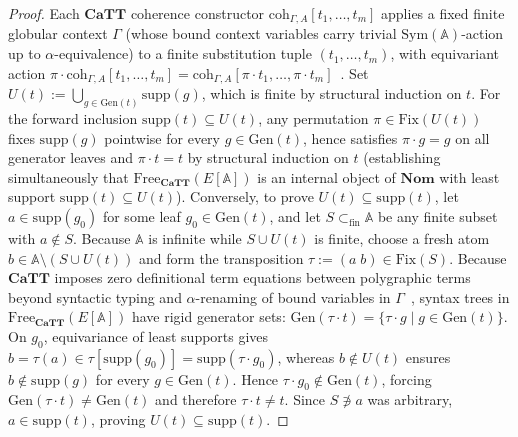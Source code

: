 \begin{proof}
Each $\mathbf{CaTT}$ coherence constructor $\mathrm{coh}_{\Gamma, A}[t_1, \dots, t_m]$ applies a fixed finite globular context $\Gamma$ (whose bound context variables carry trivial $\mathrm{Sym}(\mathbb{A})$-action up to $\alpha$-equivalence) to a finite substitution tuple $(t_1, \dots, t_m)$, with equivariant action $\pi \cdot \mathrm{coh}_{\Gamma, A}[t_1, \dots, t_m] = \mathrm{coh}_{\Gamma, A}[\pi \cdot t_1, \dots, \pi \cdot t_m]$~\cite{FinsterMimram17,BCM26}. Set $U(t) := \bigcup_{g \in \mathrm{Gen}(t)} \mathrm{supp}(g)$, which is finite by structural induction on $t$. For the forward inclusion $\mathrm{supp}(t) \subseteq U(t)$, any permutation $\pi \in \mathrm{Fix}(U(t))$ fixes $\mathrm{supp}(g)$ pointwise for every $g \in \mathrm{Gen}(t)$, hence satisfies $\pi \cdot g = g$ on all generator leaves and $\pi \cdot t = t$ by structural induction on $t$ (establishing simultaneously that $\mathrm{Free}_{\mathbf{CaTT}}(E[\mathbb{A}])$ is an internal object of $\mathbf{Nom}$ with least support $\mathrm{supp}(t) \subseteq U(t)$). Conversely, to prove $U(t) \subseteq \mathrm{supp}(t)$, let $a \in \mathrm{supp}(g_0)$ for some leaf $g_0 \in \mathrm{Gen}(t)$, and let $S \subset_{\mathrm{fin}} \mathbb{A}$ be any finite subset with $a \notin S$. Because $\mathbb{A}$ is infinite while $S \cup U(t)$ is finite, choose a fresh atom $b \in \mathbb{A} \setminus (S \cup U(t))$ and form the transposition $\tau := (a \; b) \in \mathrm{Fix}(S)$. Because $\mathbf{CaTT}$ imposes zero definitional term equations between polygraphic terms beyond syntactic typing and $\alpha$-renaming of bound variables in $\Gamma$~\cite{FinsterMimram17,BCM26}, syntax trees in $\mathrm{Free}_{\mathbf{CaTT}}(E[\mathbb{A}])$ have rigid generator sets: $\mathrm{Gen}(\tau \cdot t) = \{\tau \cdot g \mid g \in \mathrm{Gen}(t)\}$. On $g_0$, equivariance of least supports gives $b = \tau(a) \in \tau[\mathrm{supp}(g_0)] = \mathrm{supp}(\tau \cdot g_0)$, whereas $b \notin U(t)$ ensures $b \notin \mathrm{supp}(g)$ for every $g \in \mathrm{Gen}(t)$. Hence $\tau \cdot g_0 \notin \mathrm{Gen}(t)$, forcing $\mathrm{Gen}(\tau \cdot t) \neq \mathrm{Gen}(t)$ and therefore $\tau \cdot t \neq t$. Since $S \not\ni a$ was arbitrary, $a \in \mathrm{supp}(t)$, proving $U(t) \subseteq \mathrm{supp}(t)$.
\end{proof}

